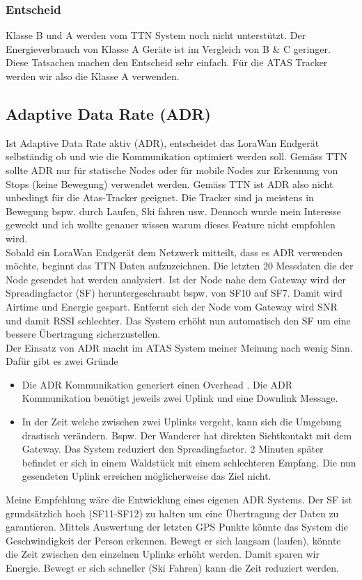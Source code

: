 \documentclass[11pt,english,german]{report}
\theoremstyle{definition}
\begin{document}
\subsubsection{Entscheid}
Klasse B und A werden vom TTN System noch nicht unterstützt. Der Energieverbrauch von Klasse A Geräte ist im Vergleich von B \& C geringer. Diese Tatsachen machen den Entscheid sehr einfach. Für die ATAS Tracker werden wir also die Klasse A verwenden. 

\subsection{Adaptive Data Rate (ADR)}
Ist Adaptive Data Rate aktiv (ADR), entscheidet das LoraWan Endgerät selbständig ob und wie die Kommunikation optimiert werden soll. Gemäss TTN \cite{ADRTTN} sollte ADR nur für statische Nodes oder für mobile Nodes zur Erkennung von Stops (keine Bewegung) verwendet werden. Gemäss TTN ist ADR also nicht unbedingt für die Atas-Tracker geeignet. Die Tracker sind ja meistens in Bewegung bspw. durch Laufen, Ski fahren usw. Dennoch wurde mein Interesse geweckt und ich wollte genauer wissen warum dieses Feature nicht empfohlen wird.\\[0.3cm]
Sobald ein LoraWan Endgerät dem Netzwerk mitteilt, dass es ADR verwenden möchte, beginnt das TTN Daten aufzuzeichnen. Die letzten 20 Messdaten die der Node gesendet hat werden analysiert. Ist der Node nahe dem Gateway wird der Spreadingfactor (SF) heruntergeschraubt bspw. von SF10 auf SF7. Damit wird Airtime und Energie gespart. Entfernt sich der Node vom Gateway wird SNR und damit RSSI schlechter. Das System erhöht nun automatisch  den SF um eine bessere Übertragung sicherzustellen.\\[0.3cm]
Der Einsatz von ADR macht im ATAS System meiner Meinung nach wenig Sinn. Dafür gibt es zwei Gründe
\begin{itemize}
\item Die ADR Kommunikation generiert einen Overhead \cite{adroverhead}. Die ADR Kommunikation benötigt jeweils zwei Uplink und eine Downlink Message. 
\item In der Zeit welche zwischen zwei Uplinks vergeht, kann sich die Umgebung drastisch verändern. Bspw. Der Wanderer hat direkten Sichtkontakt mit dem Gateway. Das System reduziert den Spreadingfactor. 2 Minuten später befindet er sich in einem Waldstück mit einem schlechteren Empfang. Die nun gesendeten Uplink erreichen möglicherweise das Ziel nicht.
\end{itemize}Meine Empfehlung wäre die Entwicklung eines eigenen ADR Systems. Der SF ist grundsätzlich hoch (SF11-SF12) zu halten um eine Übertragung der Daten zu garantieren. Mittels Auswertung der letzten GPS Punkte könnte das System die Geschwindigkeit der Person erkennen. Bewegt er sich langsam (laufen), könnte die Zeit zwischen den einzelnen Uplinks erhöht werden. Damit sparen wir Energie. Bewegt er sich schneller (Ski Fahren) kann die Zeit reduziert werden. 
\end{document}
